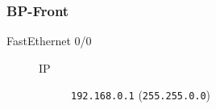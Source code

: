 \subsubsection{BP-Front}

	\begin{description}
		\item[FastEthernet 0/0] 
		\begin{description}
			\item[IP] \texttt{192.168.0.1} (\texttt{255.255.0.0})
		\end{description}
	\end{description}
	
	\clearpage

